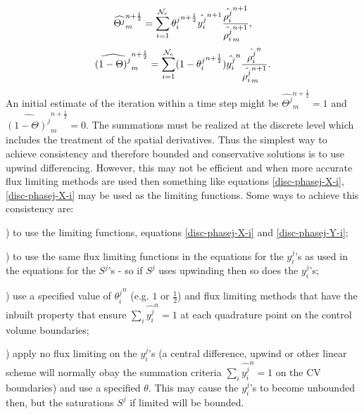 \begin{eqnarray}
\widehat{{\Theta}^j}_m^{n+\frac{1}{2}}
=\sum_{i=1}^{{\cal N}_c} {\theta_i^j}^{n+\frac{1}{2}}\hat{y_{i}^{j}}^{n+1}
\frac{\hat{\rho_i^{j}}^{n+1}}{ \tilde{\rho_i^{j}}^{n+1}_m} , 
\label{disc-phasej-X-i}
\end{eqnarray}
\begin{eqnarray}
\widehat{{(1-\Theta)}^j}_m^{n+\frac{1}{2}}
= \sum_{i=1}^{{\cal N}_c} (1-{\theta_i^j}^{n+\frac{1}{2}}) 
\hat{y_{i}^{j}}^n \frac{\hat{\rho_i^{j}}^{n}}{\tilde{\rho_i^{j}}^{n+1}_m}  . 
\label{disc-phasej-Y-i}
\end{eqnarray}
An initial estimate of the iteration within a 
time step might be 
$\widehat{{\Theta}^j}_m^{n+\frac{1}{2}}=1$ 
and  
$\widehat{{(1-\Theta)}^j}_m^{n+\frac{1}{2}}=0$. 
The summations must be realized 
at the discrete level which includes the treatment of the spatial derivatives. 
Thus the simplest way to achieve consistency and therefore bounded 
and conservative solutions is to use upwind differencing. 
However, this may not be efficient and when more accurate 
flux limiting methods are used then something like equations \ref{disc-phasej-X-i}, \ref{disc-phasej-X-i} may be used as the 
limiting functions. 
Some ways 
to achieve this consistency are: 
\par{}) to use the limiting functions, 
equations \ref{disc-phasej-X-i} and \ref{disc-phasej-Y-i}; 
\par{}) to use the same flux limiting 
functions in the equations for the $y_i^j$'s as used in 
the equations for the $S^j$'s - so if  $S^j$ uses upwinding 
then so does the $y_i^j$'s; 
\par{}) use a 
specified value of ${\theta_i^j}^n$ (e.g. $1$ or $\frac{1}{2}$) and 
flux limiting methods that have the inbuilt property that ensure 
$\sum_i \hat{y_{i}^{j}}^n=1$ at each quadrature point on the control 
volume boundaries; 
\par{}) apply no flux limiting on the $y_i^j$'s (a central 
difference, upwind or other linear scheme will normally 
obay the summation criteria $\sum_i \hat{y_{i}^{j}}^n=1$ 
on the CV boundaries) and use a specified $\theta$. 
This may cause the $y_i^j$'s to 
become unbounded then, but the saturations $S^j$ if limited will 
be bounded. 



